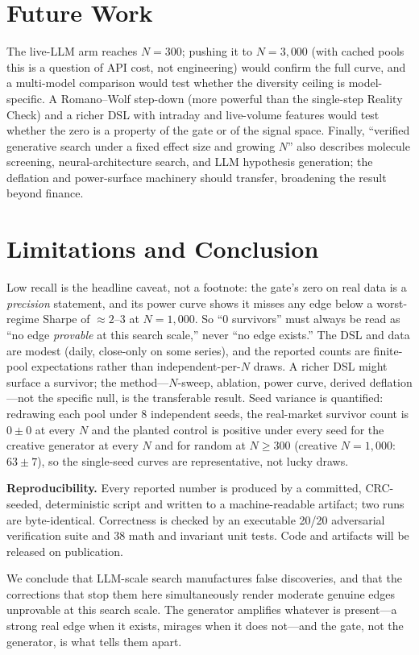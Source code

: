 \documentclass[sigconf,review,anonymous]{acmart}
\begin{document}
\section{Future Work}
The live-LLM arm reaches $N{=}300$; pushing it to $N{=}3{,}000$ (with cached pools this is a question of API cost, not engineering) would confirm the full curve, and a multi-model comparison would test whether the diversity ceiling is model-specific. A Romano--Wolf step-down (more powerful than the single-step Reality Check) and a richer DSL with intraday and live-volume features would test whether the zero is a property of the gate or of the signal space. Finally, ``verified generative search under a fixed effect size and growing $N$'' also describes molecule screening, neural-architecture search, and LLM hypothesis generation; the deflation and power-surface machinery should transfer, broadening the result beyond finance.

\section{Limitations and Conclusion}
Low recall is the headline caveat, not a footnote: the gate's zero on real data is a \emph{precision} statement, and its power curve shows it misses any edge below a worst-regime Sharpe of ${\approx}2$--$3$ at $N{=}1{,}000$. So ``0 survivors'' must always be read as ``no edge \emph{provable} at this search scale,'' never ``no edge exists.'' The DSL and data are modest (daily, close-only on some series), and the reported counts are finite-pool expectations rather than independent-per-$N$ draws. A richer DSL might surface a survivor; the method---$N$-sweep, ablation, power curve, derived deflation---not the specific null, is the transferable result. Seed variance is quantified: redrawing each pool under 8 independent seeds, the real-market survivor count is $0\pm0$ at every $N$ and the planted control is positive under every seed for the creative generator at every $N$ and for random at $N{\ge}300$ (creative $N{=}1{,}000$: $63\pm7$), so the single-seed curves are representative, not lucky draws.

\textbf{Reproducibility.} Every reported number is produced by a committed, CRC-seeded, deterministic script and written to a machine-readable artifact; two runs are byte-identical. Correctness is checked by an executable 20/20 adversarial verification suite and 38 math and invariant unit tests. Code and artifacts will be released on publication.

We conclude that LLM-scale search manufactures false discoveries, and that the corrections that stop them here simultaneously render moderate genuine edges unprovable at this search scale. The generator amplifies whatever is present---a strong real edge when it exists, mirages when it does not---and the gate, not the generator, is what tells them apart.
\end{document}
